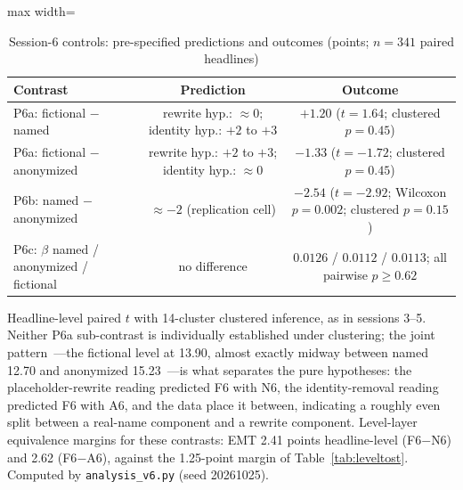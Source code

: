 \begin{table}[htbp]
\centering
\small
\caption{Session-6 controls: pre-specified predictions and outcomes (points; $n=341$ paired headlines)}
\label{tab:s6}
\begin{adjustbox}{max width=\textwidth}
\begin{tabular}{lcc}
\toprule
Contrast & Prediction & Outcome \\
\midrule
P6a: fictional $-$ named & rewrite hyp.: $\approx 0$; identity hyp.: $+2$ to $+3$ & $+1.20$ ($t=1.64$; clustered $p=0.45$) \\
P6a: fictional $-$ anonymized & rewrite hyp.: $+2$ to $+3$; identity hyp.: $\approx 0$ & $-1.33$ ($t=-1.72$; clustered $p=0.45$) \\
P6b: named $-$ anonymized & $\approx -2$ (replication cell) & $-2.54$ ($t=-2.92$; Wilcoxon $p=0.002$; clustered $p=0.15$) \\
P6c: $\beta$ named / anonymized / fictional & no difference & $0.0126$ / $0.0112$ / $0.0113$; all pairwise $p\geq 0.62$ \\
\bottomrule
\end{tabular}
\end{adjustbox}
\begin{tablenotes}[flushleft]\footnotesize
\item Headline-level paired $t$ with 14-cluster clustered inference, as in sessions 3--5. Neither P6a sub-contrast is individually established under clustering; the joint pattern~---the fictional level at 13.90, almost exactly midway between named 12.70 and anonymized 15.23~---is what separates the pure hypotheses: the placeholder-rewrite reading predicted F6 with N6, the identity-removal reading predicted F6 with A6, and the data place it between, indicating a roughly even split between a real-name component and a rewrite component. Level-layer equivalence margins for these contrasts: EMT 2.41 points headline-level (F6$-$N6) and 2.62 (F6$-$A6), against the 1.25-point margin of Table~\ref{tab:leveltost}. Computed by \texttt{analysis\_v6.py} (seed 20261025).
\end{tablenotes}
\end{table}


